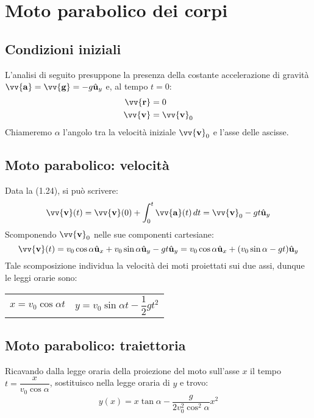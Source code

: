 \documentclass{report}
\newcommand{\versore}[1]{\hat{\mathbf{u}}_{#1}}
\newcommand{\ux}{\versore{x}}
\newcommand{\uy}{\versore{y}}
\newcommand{\vett}[1]{\vv{\boldsymbol{\mathbf{#1}}}}
\begin{document}

\section{Moto parabolico dei corpi}
\subsection{Condizioni iniziali}
L'analisi di seguito presuppone la presenza della costante accelerazione di gravità
\(\vett{a} = \vett{g} = -g\uy\) e, al tempo \(t = 0\):
\begin{align*}
    \vett{r} & = 0 \\
    \vett{v} & = \vett{v}_0
\end{align*}
Chiameremo \(\alpha\) l'angolo tra la velocità iniziale \(\vett{v}_0\)
e l'asse delle ascisse.

\subsection{Moto parabolico: velocità}
Data la (1.24), si può scrivere:
\begin{equation*}
    \vett{v}(t) = \vett{v}(0) + \int_{0}^{t}\vett{a}(t)\,dt  
    = \vett{v}_0 -gt\uy
\end{equation*}
Scomponendo \(\vett{v}_0\) nelle sue componenti cartesiane:
\begin{equation*}
    \vett{v}(t) = v_0\cos\alpha\ux + v_0\sin\alpha\uy - gt\uy 
    = v_0\cos\alpha\ux + (v_0\sin\alpha - gt)\uy
\end{equation*}
Tale scomposizione individua la velocità dei moti proiettati sui due assi, 
dunque le leggi orarie sono:

\setlength{\extrarowheight}{20pt}
\begin{tabularx}{\textwidth}{CC} 
    \(x = v_0\cos\alpha t\) & \(y = v_0\sin\alpha t - \dfrac{1}{2}gt^2\)
\end{tabularx}

\subsection{Moto parabolico: traiettoria}
Ricavando dalla legge oraria della proiezione del moto sull'asse \(x\)
il tempo\\ \(t = \dfrac{x}{v_0\cos\alpha}\), sostituisco nella legge oraria 
di \(y\) e trovo:
\begin{equation*}
    y(x) = x\tan\alpha - \frac{g}{2v_0^2\cos^2\alpha}x^2
\end{equation*}
\end{document}
